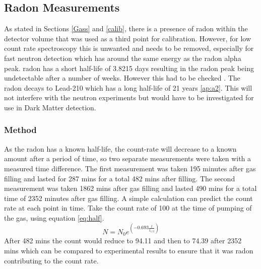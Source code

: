 \documentclass[a4paper]{article}
\begin{document}
\subsection{Radon Measurements} \label{radon}
As stated in Sections \ref{Gass} and \ref{calib}, there is a presence of radon within the detector volume that was used as a third point for calibration. However, for low count rate spectroscopy this is unwanted and needs to be removed, especially for fast neutron detection which has around the same energy as the radon alpha peak.
\newline radon has a short half-life of 3.8215 days resulting in the radon peak being undetectable after a number of weeks. However this had to be checked \cite{osti_1348827}. The radon decays to Lead-210 which has a long half-life of 21 years \ref{ap:a2}. This will not interfere with the neutron experiments but would have to be investigated for use in Dark Matter detection. 
\subsubsection{Method}
As the radon has a known half-life, the count-rate will decrease to a known amount after a period of time, so two separate measurements were taken with a measured time difference. The first measurement was taken 195 minutes after gas filling and lasted for 287 mins for a total 482 mins after filling. The second measurement was taken 1862 mins after gas filling and lasted 490 mins for a total time of 2352 minutes after gas filling.
\newline A simple calculation can predict the count rate at each point in time. Take the count rate of 100 at the time of pumping of the gas, using equation \ref{eq:half}.
\begin{equation}
    N = N_0e^{(-0.693\frac{t}{t_{1/2}})}
    \label{eq:half}
\end{equation}
\noindent After 482 mins the count would reduce to 94.11 and then to 74.39 after 2352 mins which can be compared to experimental results to ensure that it was radon contributing to the count rate.
\end{document}
